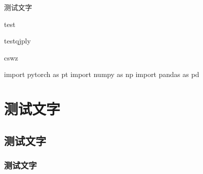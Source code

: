\begin{Project}
\begin{NumberedItem}
	\item 测试文字
	\item test
	\item testqjply
\end{NumberedItem}



\begin{Proof}
	\lipsum[1]
	\tcblower
	\lipsum
\end{Proof}

\begin{Block}%
	\lipsum[1]
	\tcblower
	\lipsum
\end{Block}


\begin{Check}
	\lipsum[1-2]
	\tcbline
	\lipsum[1-2]
\end{Check}

\begin{Warning}
	\lipsum[2]
	\tcblower
	cswz
\end{Warning}



\begin{Vocabulary}
	\lipsum
\end{Vocabulary}



\Remark{\lipsum[2][1-3]}

\begin{PythonBox}[神经网络]
import pytorch as pt
import numpy as np
import pandas as pd
\end{PythonBox}

\end{Project}








\section{测试文字}

\makeatletter
{}
\makeatother
\lipsum



\subsection{测试文字}
\subsubsection{测试文字}


